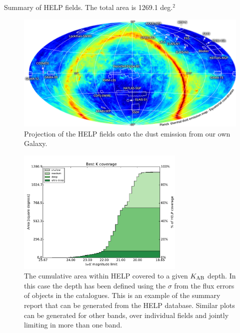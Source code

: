 \documentclass[usenatbib]{mnras}
\begin{document}
\begin{table}
  
  \caption{Summary of HELP fields.  The total area is 1269.1 deg.$^2$}
\end{table}


\begin{figure}
  \centering \includegraphics[width=16cm]{figs/HELP-fields.png}
  \caption[HELP Sky]{Projection of the HELP fields onto the dust emission from
    our own Galaxy.}\label{fig:helpsky}
\end{figure}

\begin{figure}
  \includegraphics[width=8cm]{figs/K_coverage_v1_2_full.pdf}
  \caption[K-band coverage]{The cumulative area within HELP covered to a given
    $K_{\rm AB}$ depth. In this case the depth has been defined using the
    $\sigma$ from the flux errors of objects in the catalogues. This is an example
    of the summary report that can be generated from the HELP database. Similar
    plots can be generated for other bands, over individual fields and jointly
    limiting in more than one band. }\label{fig:k}
\end{figure}
\end{document}
